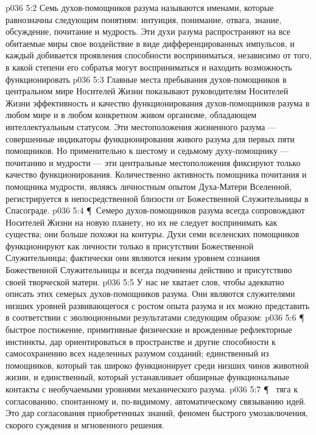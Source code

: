 \vs p036 5:2 Семь духов\hyp{}помощников разума называются именами, которые равнозначны следующим понятиям: интуиция, понимание, отвага, знание, обсуждение, почитание и мудрость. Эти духи разума распространяют на все обитаемые миры свое воздействие в виде дифференцированных импульсов, и каждый добивается проявления способности восприниматься, независимо от того, в какой степени его собратья могут восприниматься и находить возможность функционировать
\vs p036 5:3 Главные места пребывания духов\hyp{}помощников в центральном мире Носителей Жизни показывают руководителям Носителей Жизни эффективность и качество функционирования духов\hyp{}помощников разума в любом мире и в любом конкретном живом организме, обладающем интеллектуальным статусом. Эти местоположения жизненного разума --- совершенные индикаторы функционирования живого разума для первых пяти помощников. Но применительно к шестому и седьмому духу\hyp{}помощнику --- почитанию и мудрости --- эти центральные местоположения фиксируют только качество функционирования. Количественно активность помощника почитания и помощника мудрости, являясь личностным опытом Духа\hyp{}Матери Вселенной, регистрируется в непосредственной близости от Божественной Служительницы в Спасограде.
\vs p036 5:4 \P\ Семеро духов\hyp{}помощников разума всегда сопровождают Носителей Жизни на новую планету, но их не следует воспринимать как существа; они больше похожи на контуры. Духи семи вселенских помощников функционируют как личности только в присутствии Божественной Служительницы; фактически они являются неким уровнем сознания Божественной Служительницы и всегда подчинены действию и присутствию своей творческой матери.
\vs p036 5:5 У нас не хватает слов, чтобы адекватно описать этих семерых духов\hyp{}помощников разума. Они являются служителями низших уровней развивающегося с ростом опыта разума и их можно представить в соответствии с эволюционными результатами следующим образом:
\vs p036 5:6 \P\ \bibnobreakspace {} быстрое постижение, примитивные физические и врожденные рефлекторные инстинкты, дар ориентироваться в пространстве и другие способности к самосохранению всех наделенных разумом созданий; единственный из помощников, который так широко функционирует среди низших чинов животной жизни, и единственный, который устанавливает обширные функциональные контакты с необучаемыми уровнями механического разума.
\vs p036 5:7 \P\ \bibnobreakspace {} тяга к согласованию, спонтанному и, по\hyp{}видимому, автоматическому связыванию идей. Это дар согласования приобретенных знаний, феномен быстрого умозаключения, скорого суждения и мгновенного решения.

